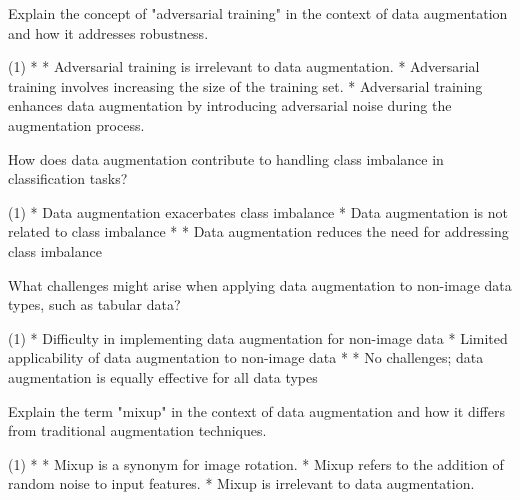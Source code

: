 \documentclass[11pt]{extarticle}
\begin{document}
\begin{exercise}
    Explain the concept of "adversarial training" in the context of data augmentation and how it addresses robustness.
    \begin{choice} (1)
        * 
        * Adversarial training is irrelevant to data augmentation.
        * Adversarial training involves increasing the size of the training set.
        * Adversarial training enhances data augmentation by introducing adversarial noise during the augmentation process.
    \end{choice}
\end{exercise}
\begin{solution}
\end{solution}

\begin{exercise}
    How does data augmentation contribute to handling class imbalance in classification tasks?
    \begin{choice} (1)
        * Data augmentation exacerbates class imbalance
        * Data augmentation is not related to class imbalance
        * 
        * Data augmentation reduces the need for addressing class imbalance
    \end{choice}
\end{exercise}
\begin{solution}
\end{solution}

\begin{exercise}
    What challenges might arise when applying data augmentation to non-image data types, such as tabular data?
    \begin{choice}(1)
        * Difficulty in implementing data augmentation for non-image data
        * Limited applicability of data augmentation to non-image data
        * 
        * No challenges; data augmentation is equally effective for all data types
    \end{choice}
\end{exercise}
\begin{solution}
\end{solution}

\begin{exercise}
    Explain the term "mixup" in the context of data augmentation and how it differs from traditional augmentation techniques.
    \begin{choice}(1)
        * 
        * Mixup is a synonym for image rotation.
        * Mixup refers to the addition of random noise to input features.
        * Mixup is irrelevant to data augmentation.
    \end{choice}
\end{exercise}
\begin{solution}
\end{solution}
\end{document}
